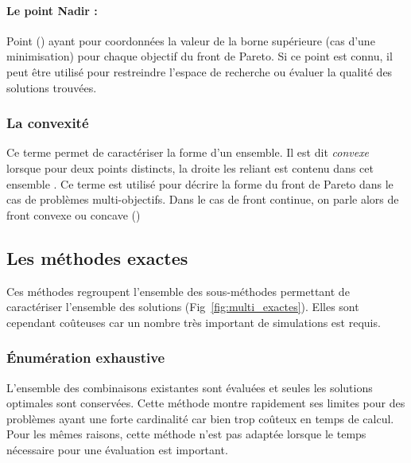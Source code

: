 \paragraph{Le point Nadir :} %
\label{par:le_point_nadir}
Point () ayant pour coordonnées la
valeur de la borne supérieure (cas d’une minimisation) pour chaque objectif du front
de Pareto. Si ce point est connu, il peut être utilisé pour restreindre l’espace
de recherche ou évaluer la qualité des solutions trouvées.



\subsubsection{La convexité} %
\label{ssub:la_convexite}
Ce terme permet de caractériser la forme d’un ensemble.
Il est dit \emph{convexe} lorsque pour deux points distincts, la droite les reliant
est contenu dans cet ensemble \parencite{Collette2002}. Ce terme est utilisé pour décrire
la forme du front de Pareto dans le cas de problèmes multi-objectifs. Dans le cas
de front continue, on parle alors de front convexe ou concave ()



\subsection{Les méthodes exactes} %
\label{sub:les_methodes_exactes}
Ces méthodes regroupent l’ensemble des sous-méthodes permettant de caractériser
l’ensemble des solutions (Fig~\ref{fig:multi_exactes}). Elles sont cependant
coûteuses car un nombre très important de simulations est requis.


\subsubsection{Énumération exhaustive} %
\label{ssub:enumeration_exhaustive}
L’ensemble des combinaisons existantes sont évaluées et seules les solutions optimales
sont conservées. Cette méthode montre rapidement ses limites pour des problèmes ayant une
forte cardinalité car bien trop coûteux en temps de calcul. Pour les mêmes raisons,
cette méthode n’est pas adaptée lorsque le temps nécessaire pour une évaluation est
important.


